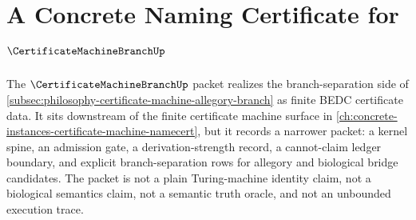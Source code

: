 \chapter{A Concrete Naming Certificate for $\CertificateMachineBranchUp$}
\label{ch:concrete-instances-certificate-machine-branch-namecert}

The $\CertificateMachineBranchUp$ packet realizes the branch-separation side of \autoref{subsec:philosophy-certificate-machine-allegory-branch} as finite BEDC certificate data. It sits downstream of the finite certificate machine surface in \autoref{ch:concrete-instances-certificate-machine-namecert}, but it records a narrower packet: a kernel spine, an admission gate, a derivation-strength record, a cannot-claim ledger boundary, and explicit branch-separation rows for allegory and biological bridge candidates. The packet is not a plain Turing-machine identity claim, not a biological semantics claim, not a semantic truth oracle, and not an unbounded execution trace.

